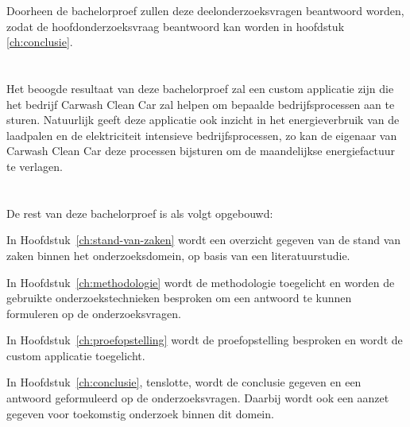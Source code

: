 Doorheen de bachelorproef zullen deze deelonderzoeksvragen beantwoord worden, zodat de hoofdonderzoeksvraag beantwoord kan worden in hoofdstuk \ref{ch:conclusie}.

\section{}%
\label{sec:onderzoeksdoelstelling}

Het beoogde resultaat van deze bachelorproef zal een custom applicatie zijn die het bedrijf Carwash Clean Car zal helpen om bepaalde bedrijfsprocessen aan te sturen. Natuurlijk geeft deze applicatie ook inzicht in het energieverbruik van de laadpalen en de elektriciteit intensieve bedrijfsprocessen, zo kan de eigenaar van Carwash Clean Car deze processen bijsturen om de maandelijkse energiefactuur te verlagen.

\section{}%
\label{sec:opzet-bachelorproef}


De rest van deze bachelorproef is als volgt opgebouwd:

In Hoofdstuk~\ref{ch:stand-van-zaken} wordt een overzicht gegeven van de stand van zaken binnen het onderzoeksdomein, op basis van een literatuurstudie.

In Hoofdstuk~\ref{ch:methodologie} wordt de methodologie toegelicht en worden de gebruikte onderzoekstechnieken besproken om een antwoord te kunnen formuleren op de onderzoeksvragen.

In Hoofdstuk~\ref{ch:proefopstelling} wordt de proefopstelling besproken en wordt de custom applicatie toegelicht.

In Hoofdstuk~\ref{ch:conclusie}, tenslotte, wordt de conclusie gegeven en een antwoord geformuleerd op de onderzoeksvragen. Daarbij wordt ook een aanzet gegeven voor toekomstig onderzoek binnen dit domein.